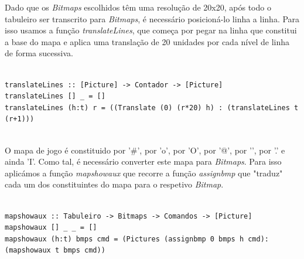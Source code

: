 \documentclass[12pt,a4paper]{report}
\begin{document}
\hfill

\hfill

Dado que os \emph{Bitmaps} escolhidos têm uma resolução de 20x20, após todo o tabuleiro ser transcrito para  \emph{Bitmaps}, é necessário posicioná-lo linha a linha. Para isso usamos a função \emph{translateLines}, que começa por pegar na linha que constitui a base do mapa e aplica uma translação de 20 unidades por cada nível de linha de forma sucessiva.\\

\begin{verbatim}

translateLines :: [Picture] -> Contador -> [Picture]
translateLines [] _ = []
translateLines (h:t) r = ((Translate (0) (r*20) h) : (translateLines t (r+1)))


\end{verbatim}

\hfill

\hfill

O mapa de jogo é constituido por '\#', por 'o', por 'O', por '@', por '\space', por '.' e ainda 'I'. Como tal, é necessário converter este mapa para \emph{Bitmaps}. Para isso aplicámos a função \emph{mapshowaux} que recorre a função \emph{assignbmp} que "traduz" cada um dos constituintes do mapa para o respetivo \emph{Bitmap}.\\

\begin{verbatim}

mapshowaux :: Tabuleiro -> Bitmaps -> Comandos -> [Picture]
mapshowaux [] _ _ = []
mapshowaux (h:t) bmps cmd = (Pictures (assignbmp 0 bmps h cmd):(mapshowaux t bmps cmd))

\end{verbatim}
\end{document}
